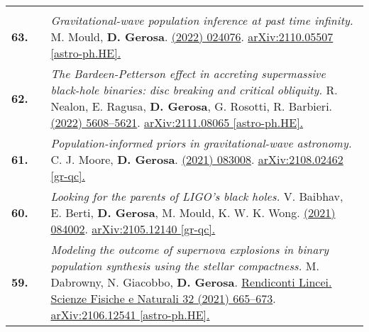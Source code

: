 {\begin{longtable}{rp{0.3cm}p{15.8cm}}
\vspace{0.09cm}\\
%
\textbf{63.} & & \textit{Gravitational-wave population inference at past time infinity.}
\newline{}
M. Mould, \textbf{D. Gerosa}.
\newline{}
\href{https://journals.aps.org/prd/abstract/10.1103/PhysRevD.105.024076}{\prd 105 (2022) 024076}. \href{https://arxiv.org/abs/2110.05507}{arXiv:2110.05507 [astro-ph.HE].}
\vspace{0.09cm}\\
%
\textbf{62.} & & \textit{The Bardeen-Petterson effect in accreting supermassive black-hole binaries: disc breaking and critical obliquity.}
\newline{}
R. Nealon, E. Ragusa, \textbf{D. Gerosa}, G. Rosotti, R. Barbieri.
\newline{}
\href{https://doi.org/10.1093/mnras/stab3328}{\mnras 509 (2022) 5608–5621}. \href{https://arxiv.org/abs/2111.08065}{arXiv:2111.08065 [astro-ph.HE].}
\vspace{0.09cm}\\
%
\textbf{61.} & & \textit{Population-informed priors in gravitational-wave astronomy.}
\newline{}
C. J. Moore, \textbf{D. Gerosa}.
\newline{}
\href{https://journals.aps.org/prd/abstract/10.1103/PhysRevD.104.083008}{\prd 104 (2021) 083008}. \href{https://arxiv.org/abs/2108.02462}{arXiv:2108.02462 [gr-qc].}
\vspace{0.09cm}\\
%
\textbf{60.} & & \textit{Looking for the parents of LIGO's black holes.}
\newline{}
V. Baibhav, E. Berti, \textbf{D. Gerosa}, M. Mould, K. W. K. Wong.
\newline{}
\href{https://journals.aps.org/prd/abstract/10.1103/PhysRevD.104.084002}{\prd 104 (2021) 084002}. \href{https://arxiv.org/abs/2105.12140}{arXiv:2105.12140 [gr-qc].}
\vspace{0.09cm}\\
%
\textbf{59.} & & \textit{Modeling the outcome of supernova explosions in binary population synthesis using the stellar compactness.}
\newline{}
M. Dabrowny, N. Giacobbo, \textbf{D. Gerosa}.
\newline{}
\href{https://link.springer.com/article/10.1007/s12210-021-01019-8}{Rendiconti Lincei. Scienze Fisiche e Naturali 32 (2021) 665–673}. \href{https://arxiv.org/abs/2106.12541}{arXiv:2106.12541 [astro-ph.HE].}

\end{longtable}}
